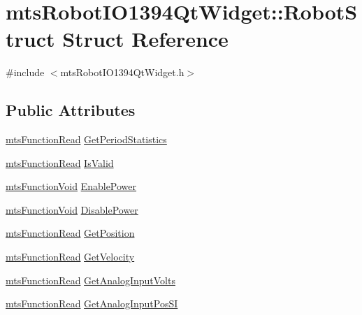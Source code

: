 \hypertarget{structmts_robot_i_o1394_qt_widget_1_1_robot_struct}{\section{mts\-Robot\-I\-O1394\-Qt\-Widget\-:\-:Robot\-Struct Struct Reference}
\label{structmts_robot_i_o1394_qt_widget_1_1_robot_struct}
}


{\ttfamily \#include $<$mts\-Robot\-I\-O1394\-Qt\-Widget.\-h$>$}

\subsection*{Public Attributes}
\begin{DoxyCompactItemize}
\item 
\hyperlink{classmts_function_read}{mts\-Function\-Read} \hyperlink{structmts_robot_i_o1394_qt_widget_1_1_robot_struct_ac8c2cbe5059167223f44423db92f6290}{Get\-Period\-Statistics}
\item 
\hyperlink{classmts_function_read}{mts\-Function\-Read} \hyperlink{structmts_robot_i_o1394_qt_widget_1_1_robot_struct_ac277e603818049a49eb08f5e10a620cc}{Is\-Valid}
\item 
\hyperlink{classmts_function_void}{mts\-Function\-Void} \hyperlink{structmts_robot_i_o1394_qt_widget_1_1_robot_struct_aae3a95437e62a7b86be6380abad6def1}{Enable\-Power}
\item 
\hyperlink{classmts_function_void}{mts\-Function\-Void} \hyperlink{structmts_robot_i_o1394_qt_widget_1_1_robot_struct_a7adafb190e31ef50c5a022af76e889e9}{Disable\-Power}
\item 
\hyperlink{classmts_function_read}{mts\-Function\-Read} \hyperlink{structmts_robot_i_o1394_qt_widget_1_1_robot_struct_ab3a0e1cb41daa3529a120252fe4ea5c0}{Get\-Position}
\item 
\hyperlink{classmts_function_read}{mts\-Function\-Read} \hyperlink{structmts_robot_i_o1394_qt_widget_1_1_robot_struct_acc5aecde318ce18fe296558cae218253}{Get\-Velocity}
\item 
\hyperlink{classmts_function_read}{mts\-Function\-Read} \hyperlink{structmts_robot_i_o1394_qt_widget_1_1_robot_struct_a9bfa9bc30d77fa3a4236d1221e38b6a8}{Get\-Analog\-Input\-Volts}
\item 
\hyperlink{classmts_function_read}{mts\-Function\-Read} \hyperlink{structmts_robot_i_o1394_qt_widget_1_1_robot_struct_a819b7a8bfbef4b02fee75b448798cceb}{Get\-Analog\-Input\-Pos\-S\-I}

\end{DoxyCompactItemize}

